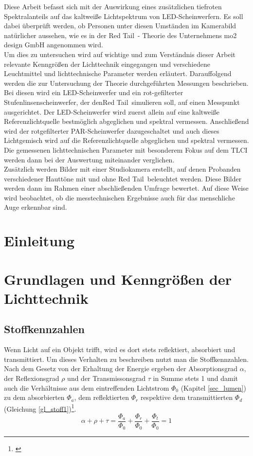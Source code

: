 Diese Arbeit befasst sich mit der Auswirkung eines zusätzlichen tiefroten Spektralanteils auf das kaltweiße Lichtspektrum von LED-Scheinwerfern. Es soll dabei überprüft werden, ob Personen unter diesen Umständen im Kamerabild natürlicher aussehen, wie es in der \glqq Red Tail\grqq\ - Theorie des Unternehmens mo2 design GmbH angenommen wird.\\
Um dies zu untersuchen wird auf wichtige und zum Verständnis dieser Arbeit relevante Kenngrößen der Lichttechnik eingegangen und verschiedene Leuchtmittel und lichttechnische Parameter werden erläutert. Darauffolgend werden die zur Untersuchung der Theorie durchgeführten Messungen beschrieben. Bei diesen wird ein LED-Scheinwerfer und ein rot-gefilterter Stufenlinsenscheinwerfer, der den\glqq Red Tail\grqq\ simulieren soll, auf einen Messpunkt ausgerichtet. Der LED-Scheinwerfer wird zuerst allein auf eine kaltweiße Referenzlichtquelle bestmöglich abgeglichen und spektral vermessen. Anschließend wird der rotgefilterter PAR-Scheinwerfer dazugeschaltet und auch dieses Lichtgemisch wird auf die Referenzlichtquelle abgeglichen und spektral vermessen. Die gemessenen lichttechnischen Parameter mit besonderem Fokus auf dem TLCI werden dann bei der Auswertung miteinander verglichen.\\
Zusätzlich werden Bilder mit einer Studiokamera erstellt, auf denen Probanden verschiedener Hauttöne mit und ohne \glqq Red Tail\grqq\ beleuchtet werden. Diese Bilder werden dann im Rahmen einer  abschließenden Umfrage bewertet. Auf diese Weise wird beobachtet, ob die messtechnischen Ergebnisse auch für das menschliche Auge erkennbar sind. 


\chapter{Einleitung}

\chapter{Grundlagen und Kenngrößen der Lichttechnik} \label{chap_grundlagen}

\section{Stoffkennzahlen}
Wenn Licht auf ein Objekt trifft, wird es dort stets reflektiert, absorbiert und transmittiert. Um dieses Verhalten zu beschreiben nutzt man die Stoffkennzahlen. Nach dem Gesetz von der Erhaltung der Energie ergeben der Absorptionsgrad $\alpha$, der Reflexionsgrad $\rho$ und der Transmissonsgrad $\tau$ in Summe stets 1 und damit auch die Verhältnisse aus dem eintreffenden Lichtstrom $\Phi_{0}$ (Kapitel \ref{sec_lumen}) zu dem absorbierten $\Phi_{a}$, dem reflektierten $\Phi_{r}$ respektive dem transmittierten $\Phi_{d}$ (Gleichung \ref{gl_stoff1})\footnote{\cite[38]{hentschel}}.
\begin{equation}\label{gl_stoff1}
	\alpha + \rho + \tau = \frac{\Phi_{a}}{\Phi_{0}} + \frac{\Phi_{r}}{\Phi_{0}} + \frac{\Phi_{t}}{\Phi_{0}} = 1	
\end{equation}

